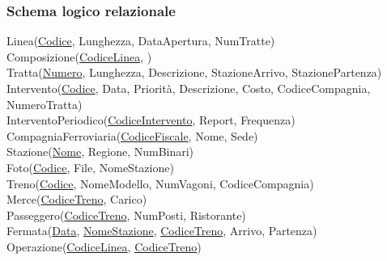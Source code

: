 \documentclass{article}
\begin{document}
\subsubsection*{Schema logico relazionale}
Linea(\underline{Codice}, Lunghezza, DataApertura, NumTratte) \vspace*{3pt}\\
Composizione(\underline{CodiceLinea}, ) \vspace*{3pt}\\
Tratta(\underline{Numero}, Lunghezza, Descrizione, StazioneArrivo, StazionePartenza) \vspace*{3pt}\\
Intervento(\underline{Codice}, Data, Priorità, Descrizione, Costo, CodiceCompagnia, NumeroTratta) \vspace*{3pt}\\
InterventoPeriodico(\underline{CodiceIntervento}, Report, Frequenza) \vspace*{3pt}\\
CompagniaFerroviaria(\underline{CodiceFiscale}, Nome, Sede) \vspace*{3pt}\\
Stazione(\underline{Nome}, Regione, NumBinari) \vspace*{3pt}\\
Foto(\underline{Codice}, File, NomeStazione) \vspace*{3pt}\\
Treno(\underline{Codice}, NomeModello, NumVagoni, CodiceCompagnia) \vspace*{3pt}\\
Merce(\underline{CodiceTreno}, Carico) \vspace*{3pt}\\
Passeggero(\underline{CodiceTreno}, NumPosti, Ristorante) \vspace*{3pt}\\
Fermata(\underline{Data}, \underline{NomeStazione}, \underline{CodiceTreno}, Arrivo, Partenza) \vspace*{3pt}\\
Operazione(\underline{CodiceLinea}, \underline{CodiceTreno}) \vspace*{3pt}\\
\end{document}
